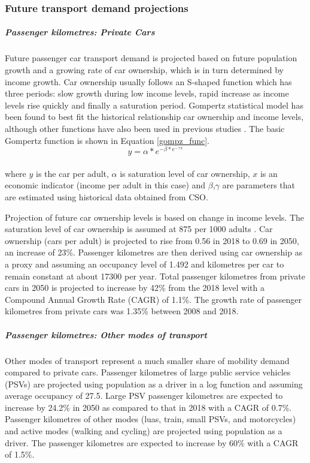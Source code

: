 \documentclass[gmd,manuscript]{copernicus}
\begin{document}
\subsubsection{Future transport demand projections}
\subparagraph{Passenger kilometres: Private Cars}
Future passenger car transport demand is projected based on future population growth and a growing rate of car ownership, which is in turn determined by income growth. Car ownership usually follows an S-shaped function which has three periods: slow growth during low income levels, rapid increase as income levels rise quickly and finally a saturation period. Gompertz statistical model has been found to best fit the historical relationship car ownership and income levels, although other functions have also been used in previous studies \citep{Lian2018}. The basic Gompertz function is shown in Equation \ref{gompz_func}.
\\
\begin{equation} \label{gompz_func}
 y=\alpha*e^{-\beta*e^{-\gamma x}}
\end{equation}
\\
where $y$ is the car per adult, $\alpha$ is saturation level of car ownership, $x$ is an economic indicator (income per adult in this case) and $\beta$,$\gamma$ are parameters that are estimated using historical data obtained from CSO. 

Projection of future car ownership levels is based on change in income levels. The saturation level of car ownership is assumed at 875 per 1000 adults \citep{AECOMIrelandLimited2019}. Car ownership (cars per adult) is projected to rise from 0.56 in 2018 to 0.69 in 2050, an increase of 23\%. Passenger kilometres are then derived using car ownership as a proxy and assuming an occupancy level of 1.492 and kilometres per car to remain constant at about 17300 per year. Total passenger kilometres from private cars in 2050 is projected to increase by 42\% from the 2018 level with a Compound Annual Growth Rate (CAGR) of 1.1\%. The growth rate of passenger kilometres from private cars was 1.35\% between 2008 and 2018. 

\subparagraph{Passenger kilometres: Other modes of transport}
Other modes of transport represent a much smaller share of mobility demand compared to private cars. Passenger kilometres of large public service vehicles (PSVs) are projected using population as a driver in a log function and assuming average occupancy of 27.5. Large PSV passenger kilometres are expected to increase by 24.2\% in 2050 as compared to that in 2018 with a CAGR of 0.7\%. Passenger kilometres of other modes (luas, train, small PSVs, and motorcycles) and active modes (walking and cycling) are projected using population as a driver. The passenger kilometres are expected to increase by 60\% with a CAGR of 1.5\%. 
\end{document}
